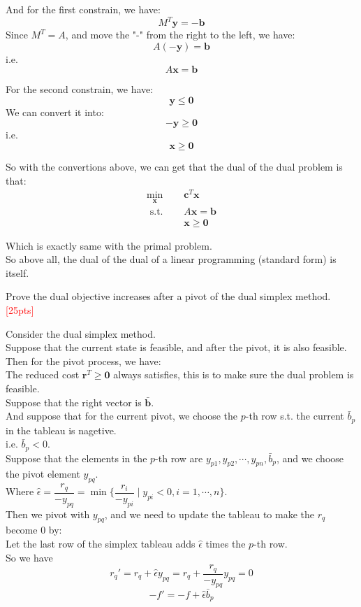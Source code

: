 \documentclass[10pt]{article}
\newenvironment{problem}[2][Problem]{\begin{trivlist}
\item[\hskip \labelsep {\bfseries #1}\hskip \labelsep {\bfseries #2.}]}{\end{trivlist}}
\begin{document}
And for the first constrain, we have:
$$M^T\bm{y} = \bm{-b}$$
Since $M^T=A$, and move the "-" from the right to the left, we have:
$$A\bm{(-y)} = \bm{b}$$
i.e.
$$A\bm{x} = \bm{b}$$

For the second constrain, we have:
$$\bm{y}\leq\bm{0}$$
We can convert it into:
$$\bm{-y}\geq\bm{0}$$
i.e.
$$\bm{x}\geq\bm{0}$$

So with the convertions above, we can get that the dual of the dual problem is that:
\begin{equation}
\begin{aligned}
\min_{\bm{x}} \quad & \bm{c}^T\bm{x} \\
\text { s.t. } \quad & A\bm{x} = \bm{b} \\
& \bm{x} \geq \bm{0}
\end{aligned}
\end{equation}

Which is exactly same with the primal problem.\\
So above all, the dual of the dual of a linear programming (standard form) is itself.\\

\newpage


\begin{problem}{2}
    Prove the dual objective increases after a pivot of the dual simplex method.\textcolor{red}{[25pts]}
\end{problem}

Consider the dual simplex method.\\
Suppose that the current state is feasible, and after the pivot, it is also feasible.\\
Then for the pivot process, we have:\\
The reduced cost $\bm{r}^T\geq \bm{0}$ always satisfies, this is to make sure the dual problem is feasible.\\
Suppose that the right vector is $\bar{\bm{b}}$.\\ 
And suppose that for the current pivot, we choose the $p$-th row s.t. the current $\bar{b}_p$ in the tableau is nagetive.\\
i.e. $\bar{b}_p<0$.\\
Suppose that the elements in the $p$-th row are $y_{p1},y_{p2},\cdots,y_{pn},\bar{b}_p$, and we choose the pivot element $y_{pq}$.\\
Where $\hat{\epsilon}=\dfrac{r_q}{-y_{pq}} = \min\{\dfrac{r_i}{-y_{pi}}\mid y_{pi}<0,i=1,\cdots,n\}$.\\
Then we pivot with $y_{pq}$, and we need to update the tableau to make the $r_q$ become $0$ by:\\
Let the last row of the simplex tableau adds $\hat{\epsilon}$ times the $p$-th row.\\
So we have
$$r_q'=r_q+\hat{\epsilon}y_{pq}=r_q+\dfrac{r_q}{-y_{pq}}y_{pq}=0$$
$$-f'=-f+\hat{\epsilon}\bar{b}_p$$
\end{document}
